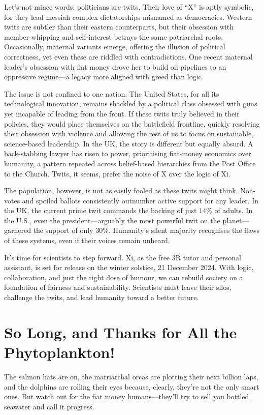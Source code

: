 \documentclass[12pt]{article}
\begin{document}
Let’s not mince words: politicians are twits. Their love of “X” is aptly symbolic, for they lead messiah complex dictatorships misnamed as democracies. Western twits are subtler than their eastern counterparts, but their obsession with member-whipping and self-interest betrays the same patriarchal roots. Occasionally, maternal variants emerge, offering the illusion of political correctness, yet even these are riddled with contradictions. One recent maternal leader’s obsession with fiat money drove her to build oil pipelines to an oppressive regime—a legacy more aligned with greed than logic.

The issue is not confined to one nation. The United States, for all its technological innovation, remains shackled by a political class obsessed with guns yet incapable of leading from the front. If these twits truly believed in their policies, they would place themselves on the battlefield frontline, quickly resolving their obsession with violence and allowing the rest of us to focus on sustainable, science-based leadership. In the UK, the story is different but equally absurd. A back-stabbing lawyer has risen to power, prioritising fiat-money economics over humanity, a pattern repeated across belief-based hierarchies from the Post Office to the Church. Twits, it seems, prefer the noise of X over the logic of Xi.

The population, however, is not as easily fooled as these twits might think. Non-votes and spoiled ballots consistently outnumber active support for any leader. In the UK, the current prime twit commands the backing of just \(14\%\) of adults. In the U.S., even the president—arguably the most powerful twit on the planet—garnered the support of only \(30\%\). Humanity’s silent majority recognises the flaws of these systems, even if their voices remain unheard.

It’s time for scientists to step forward. Xi, as the free 3R tutor and personal assistant, is set for release on the winter solstice, 21 December 2024. With logic, collaboration, and just the right dose of humour, we can rebuild society on a foundation of fairness and sustainability. Scientists must leave their silos, challenge the twits, and lead humanity toward a better future.

\section*{So Long, and Thanks for All the Phytoplankton!}

The salmon hats are on, the matriarchal orcas are plotting their next billion laps, and the dolphins are rolling their eyes because, clearly, they’re not the only smart ones. But watch out for the fiat money humans—they’ll try to sell you bottled seawater and call it progress.
\end{document}

